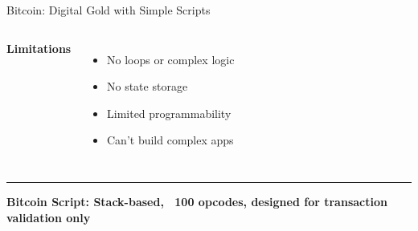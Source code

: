 \documentclass[8pt,aspectratio=169]{beamer}
\newcommand{\bottomnote}[1]{%
\vfill
\vspace{-2mm}
\textcolor{mllavender2}{\rule{\textwidth}{0.4pt}}
\vspace{1mm}
\footnotesize
\textbf{#1}
}
\begin{document}
\begin{frame}[t]{Bitcoin: Digital Gold with Simple Scripts}
\begin{columns}[T]
\vspace{0.5em}
\textbf{Limitations}
\begin{itemize}
\item[\textcolor{mlorange}{-}] No loops or complex logic
\item[\textcolor{mlorange}{-}] No state storage
\item[\textcolor{mlorange}{-}] Limited programmability
\item[\textcolor{mlorange}{-}] Can't build complex apps
\end{itemize}
\end{columns}

\bottomnote{Bitcoin Script: Stack-based, ~100 opcodes, designed for transaction validation only}
\end{frame}

\end{document}
